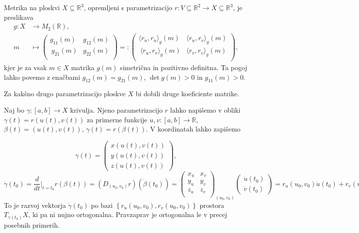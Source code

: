 \begin{definicija}
\label{def_metrika_na_ploskvi}
 Metrika na ploskvi $X \subseteq  \mathbb{R}^3$, opremljeni s
 parametrizacijo $r: V \subseteq  \mathbb{R}^2 \to  X \subseteq
 \mathbb{R}^3$, je preslikava \begin{align*}
 	g: X &\longrightarrow M_2(\mathbb{R}), \\
 	m &\longmapsto 
	\begin{pmatrix}
		g_{11}(m) & g_{12}(m) \\\
		g_{21}(m) & g_{22}(m) \\
	\end{pmatrix} =: \begin{pmatrix}
		\langle r_u, r_u \rangle_g (m) & \langle r_u, r_v \rangle_g(m) \\\
		\langle r_u, r_v \rangle_g(m) & \langle r_v, r_v \rangle_g(m) \\
	\end{pmatrix},
 \end{align*}
 kjer je za vsak $m \in  X$ matrika $g(m)$ simetrična in pozitivno definitna. Ta pogoj lahko povemo z enačbami
$g_{12}(m) = g_{21}(m)$, $\det g(m) > 0$ in $g_{11}(m) >0.$

\end{definicija}
\begin{opomba}
 Za kakšno drugo parametrizacijo ploskve $X$ bi dobili druge koeficiente
 matrike.
\end{opomba}
 Naj bo $\gamma: [a,b] \to  X$ krivulja. Njeno parametrizacijo $r$
lahko napišemo v obliki  $\gamma(t) = r(u(t), v(t))$ za primerne
funkcije $u,v : [a,b] \to \mathbb{R}$, $\beta(t) = (u(t), v(t))$,
$\gamma(t) = r(\beta(t)).$ V koordinatah lahko zapišemo 

\begin{equation*} \gamma(t) =  \begin{pmatrix}x(u(t), v(t))\\ y(u(t), v(t)) \\
z(u(t), v(t)) \end{pmatrix}, \end{equation*}
\begin{equation*} \dot{\gamma}(t_0) = \frac{d}{dt} \big|_{t = t_0} r(\beta(t)) =
(D_{(u_0, v_0)}r)(\dot{\beta}(t_0)) = 
\begin{pmatrix}
	x_u & x_v \\
	y_u & y_v \\
	z_u & z_v  \\

\end{pmatrix}_{(u_0, v_0)}
\begin{pmatrix}
	\dot{u}(t_0) \\ \dot{v}(t_0)
\end{pmatrix}
 = r_u(u_0 , v_0)\dot{u}(t_0) + r_v(u_0 , v_0)\dot{v}(t_0). \end{equation*}
 To je razvoj vektorja $\dot{\gamma}(t_0)$ po bazi $\left\{ r_u(u_0 ,
v_0), r_v(u_0 , v_0) \right\}$ prostora $T_{\gamma(t_0)}X$, ki pa ni
nujno ortogonalna. Pravzaprav je ortogonalna le v precej posebnih
primerih. 

